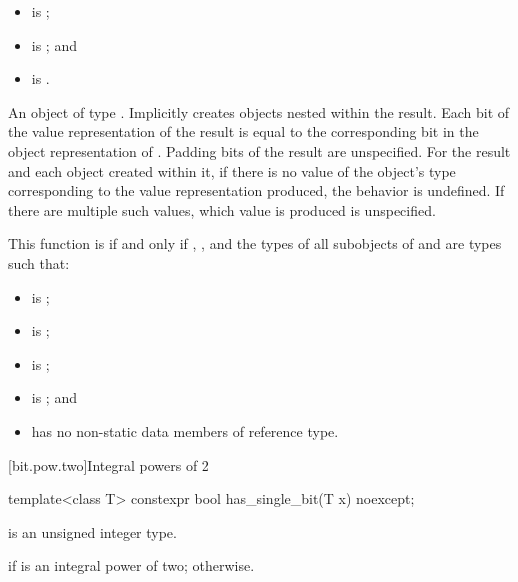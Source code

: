 \begin{itemdescr}
\pnum
\constraints
\begin{itemize}
\item {} is ;
\item {} is ; and
\item {} is .
\end{itemize}

\pnum
\returns
An object of type .
Implicitly creates objects nested within the result.
Each bit of the value representation of the result
is equal to the corresponding bit in the object representation
of . Padding bits of the result are unspecified.
For the result and each object created within it,
if there is no value of the object's type corresponding to the
value representation produced, the behavior is undefined.
If there are multiple such values, which value is produced is unspecified.

\pnum
\remarks
This function is  if and only if
, , and the types of all subobjects
of  and  are types  such that:
\begin{itemize}
\item {} is ;
\item {} is ;
\item {} is ;
\item {} is ; and
\item {} has no non-static data members of reference type.
\end{itemize}
\end{itemdescr}

[bit.pow.two]{Integral powers of 2}

%
\begin{itemdecl}
template<class T>
  constexpr bool has_single_bit(T x) noexcept;
\end{itemdecl}

\begin{itemdescr}
\pnum
\constraints
{} is an unsigned integer type.

\pnum
\returns
{} if  is an integral power of two;
 otherwise.
\end{itemdescr}

